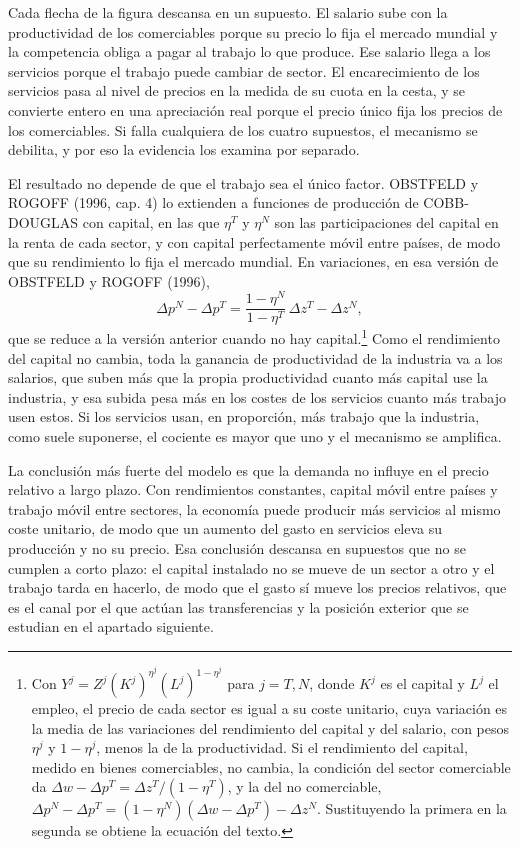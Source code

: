 \documentclass[10pt,a4paper]{article}
\begin{document}
Cada flecha de la figura descansa en un supuesto. El salario sube con la productividad de los comerciables porque su precio lo fija el mercado mundial y la competencia obliga a pagar al trabajo lo que produce. Ese salario llega a los servicios porque el trabajo puede cambiar de sector. El encarecimiento de los servicios pasa al nivel de precios en la medida de su cuota en la cesta, y se convierte entero en una apreciación real porque el precio único fija los precios de los comerciables. Si falla cualquiera de los cuatro supuestos, el mecanismo se debilita, y por eso la evidencia los examina por separado.

El resultado no depende de que el trabajo sea el único factor. OBSTFELD y ROGOFF (1996, cap. 4) lo extienden a funciones de producción de COBB-DOUGLAS con capital, en las que $\eta^T$ y $\eta^N$ son las participaciones del capital en la renta de cada sector, y con capital perfectamente móvil entre países, de modo que su rendimiento lo fija el mercado mundial. En variaciones, en esa versión de OBSTFELD y ROGOFF (1996),
$$\Delta p^N-\Delta p^T=\frac{1-\eta^N}{1-\eta^T}\,\Delta z^T-\Delta z^N,$$
que se reduce a la versión anterior cuando no hay capital.\footnote{%
    Con $Y^j=Z^j\left(K^j\right)^{\eta^j}\left(L^j\right)^{1-\eta^j}$ para $j=T,N$, donde $K^j$ es el capital y $L^j$ el empleo, el precio de cada sector es igual a su coste unitario, cuya variación es la media de las variaciones del rendimiento del capital y del salario, con pesos $\eta^j$ y $1-\eta^j$, menos la de la productividad. Si el rendimiento del capital, medido en bienes comerciables, no cambia, la condición del sector comerciable da $\Delta w-\Delta p^T=\Delta z^T/(1-\eta^T)$, y la del no comerciable, $\Delta p^N-\Delta p^T=(1-\eta^N)\left(\Delta w-\Delta p^T\right)-\Delta z^N$. Sustituyendo la primera en la segunda se obtiene la ecuación del texto.
} Como el rendimiento del capital no cambia, toda la ganancia de productividad de la industria va a los salarios, que suben más que la propia productividad cuanto más capital use la industria, y esa subida pesa más en los costes de los servicios cuanto más trabajo usen estos. Si los servicios usan, en proporción, más trabajo que la industria, como suele suponerse, el cociente es mayor que uno y el mecanismo se amplifica.

La conclusión más fuerte del modelo es que la demanda no influye en el precio relativo a largo plazo. Con rendimientos constantes, capital móvil entre países y trabajo móvil entre sectores, la economía puede producir más servicios al mismo coste unitario, de modo que un aumento del gasto en servicios eleva su producción y no su precio. Esa conclusión descansa en supuestos que no se cumplen a corto plazo: el capital instalado no se mueve de un sector a otro y el trabajo tarda en hacerlo, de modo que el gasto sí mueve los precios relativos, que es el canal por el que actúan las transferencias y la posición exterior que se estudian en el apartado siguiente.
\end{document}
